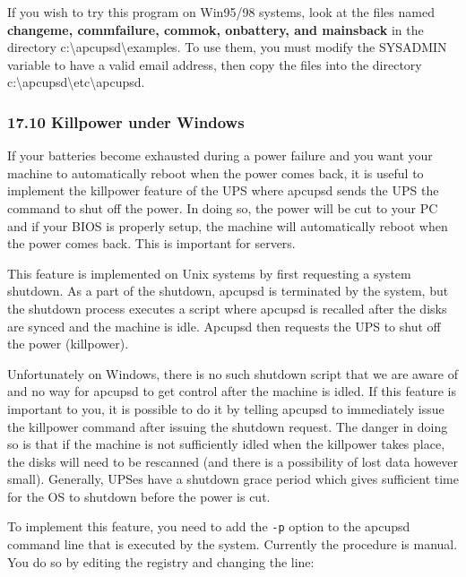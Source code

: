 {{{{{{{{{{If you wish to try this program on Win95/98 systems, look at the files named
{\bf changeme, commfailure, commok, onbattery, and mainsback} in the directory
c:\textbackslash{}apcupsd\textbackslash{}examples. To use them, you must
modify the SYSADMIN variable to have a valid email address, then copy the
files into the directory
c:\textbackslash{}apcupsd\textbackslash{}etc\textbackslash{}apcupsd. 

\label{Killpower-under-Windows}

\subsubsection*{17.10 Killpower under Windows}

\label{index-Windows_002c-Killpower-183}
If your batteries become exhausted during a power failure and you want your
machine to automatically reboot when the power comes back, it is useful to
implement the killpower feature of the UPS where apcupsd sends the UPS the
command to shut off the power.  In doing so, the power will be cut to your PC
and if your BIOS is properly setup, the machine will automatically reboot when
the power comes back. This is important for servers.  

This feature is implemented on Unix systems by first requesting a system
shutdown. As a part of the shutdown, apcupsd is terminated by the system, but
the shutdown process executes a script where apcupsd is recalled after the
disks are synced and the machine is idle. Apcupsd then requests the UPS to
shut off the power (killpower).  

Unfortunately on Windows, there is no such shutdown script that we are aware
of and no way for apcupsd to get control after the machine is idled. If this
feature is important to you, it is possible to do it by telling apcupsd to
immediately issue the killpower command after issuing the shutdown request.
The danger in doing so is that if the machine is not sufficiently idled when
the killpower takes place, the disks will need to be rescanned (and there is a
possibility of lost data however small). Generally, UPSes have a shutdown
grace period which gives sufficient time for the OS to shutdown before the
power is cut.  

To implement this feature, you need to add the {\tt -p} option to the apcupsd
command line that is executed by the system.  Currently the procedure is
manual. You do so by editing the registry and changing the line: 

}}}}}}}}}}
